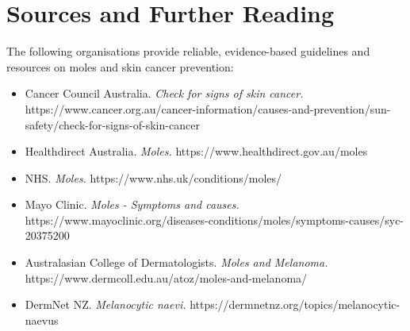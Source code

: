 \section*{Sources and Further Reading}
The following organisations provide reliable, evidence-based guidelines and resources on moles and skin cancer prevention:
\begin{itemize}
    \item Cancer Council Australia. \textit{Check for signs of skin cancer.} https://www.cancer.org.au/cancer-information/causes-and-prevention/sun-safety/check-for-signs-of-skin-cancer
    \item Healthdirect Australia. \textit{Moles.} https://www.healthdirect.gov.au/moles
    \item NHS. \textit{Moles.} https://www.nhs.uk/conditions/moles/
    \item Mayo Clinic. \textit{Moles - Symptoms and causes.} https://www.mayoclinic.org/diseases-conditions/moles/symptoms-causes/syc-20375200
    \item Australasian College of Dermatologists. \textit{Moles and Melanoma.} https://www.dermcoll.edu.au/atoz/moles-and-melanoma/
    \item DermNet NZ. \textit{Melanocytic naevi.} https://dermnetnz.org/topics/melanocytic-naevus
\end{itemize}
